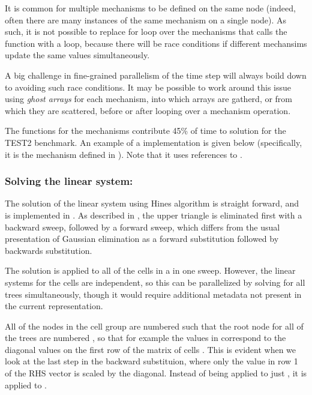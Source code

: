 
It is common for multiple mechanisms to be defined on the same node (indeed, often there are many instances of the same mechanism on a single node). As such, it is not possible to replace for loop over the mechanisms that calls the  function with a  loop, because there will be race conditions if different mechansims update the same  values simultaneously.

\begin{note}
A big challenge in fine-grained parallelism of the time step will always boild down to avoiding such race conditions. It may be possible to work around this issue using \emph{ghost arrays} for each mechanism, into which  arrays are gatherd, or from which they are scattered, before or after looping over a mechanism operation.
\end{note}

The  functions for the mechanisms contribute 45\% of time to solution for the TEST2 benchmark. An  example of a  implementation is given below (specifically, it is the mechanism defined in ). Note that it uses references to .


\subsubsection{Solving the linear system: }
The solution of the linear system using Hines algorithm is straight forward, and is implemented in . As described in , the upper triangle is eliminated first with a backward sweep, followed by a forward sweep, which differs from the usual presentation of Gaussian elimination as a forward substitution followed by backwards substitution.

\begin{note}
The solution is applied to all of the cells in a  in one sweep.
However, the linear systems for the cells are independent, so this can be parallelized by solving for all trees simultaneously, though it would require additional metadata not present in the current  representation.

All of the nodes in the cell group are numbered such that the root node for all of the trees are numbered , so that for example the values in  correspond to the diagonal values on the first row of the matrix of cells .
This is evident when we look at the last step in the backward substituion, where only the value in row 1 of the RHS vector is scaled by the diagonal.
Instead of being applied to just , it is applied to .
\end{note}

